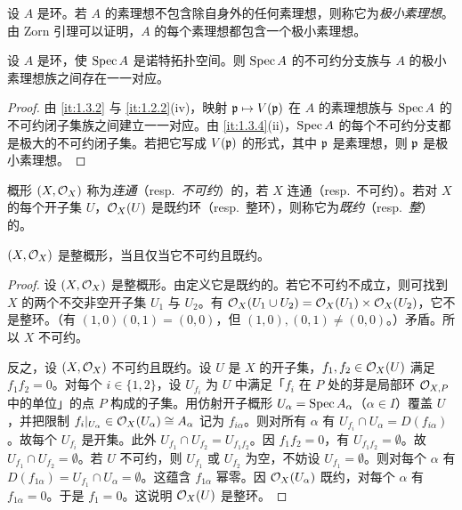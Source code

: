 设 $A$ 是环。若 $A$ 的素理想不包含除自身外的任何素理想，则称它为\emph{极小素理想}。由 Zorn 引理可以证明，$A$ 的每个素理想都包含一个极小素理想。

\begin{corollary}\label{it:1.3.5}
设 $A$ 是环，使 $\operatorname{Spec} A$ 是诺特拓扑空间。则 $\operatorname{Spec} A$ 的不可约分支族与 $A$ 的极小素理想族之间存在一一对应。
\end{corollary}

\begin{proof}
由 \ref{it:1.3.2} 与 \ref{it:1.2.2}(iv)，映射 $\mathfrak{p}\mapsto V(\mathfrak{p})$ 在 $A$ 的素理想族与 $\operatorname{Spec} A$ 的不可约闭子集族之间建立一一对应。由 \ref{it:1.3.4}(ii)，$\operatorname{Spec} A$ 的每个不可约分支都是极大的不可约闭子集。若把它写成 $V(\mathfrak{p})$ 的形式，其中 $\mathfrak{p}$ 是素理想，则 $\mathfrak{p}$ 是极小素理想。
\end{proof}

概形 $(X,\mathcal{O}_X)$ 称为\emph{连通}（resp.\ \emph{不可约}）的，若 $X$ 连通（resp.\ 不可约）。若对 $X$ 的每个开子集 $U$，$\mathcal{O}_X(U)$ 是既约环（resp.\ 整环），则称它为\emph{既约}（resp.\ \emph{整}）的。

\begin{proposition}\label{it:1.3.6}
$(X,\mathcal{O}_X)$ 是整概形，当且仅当它不可约且既约。
\end{proposition}

\begin{proof}
设 $(X,\mathcal{O}_X)$ 是整概形。由定义它是既约的。若它不可约不成立，则可找到 $X$ 的两个不交非空开子集 $U_1$ 与 $U_2$。有 $\mathcal{O}_X(U_1\cup U_2)=\mathcal{O}_X(U_1)\times \mathcal{O}_X(U_2)$，它不是整环。（有 $(1,0)(0,1)=(0,0)$，但 $(1,0),(0,1)\ne(0,0)$。）矛盾。所以 $X$ 不可约。

反之，设 $(X,\mathcal{O}_X)$ 不可约且既约。设 $U$ 是 $X$ 的开子集，$f_1,f_2\in \mathcal{O}_X(U)$ 满足 $f_1f_2=0$。对每个 $i\in\{1,2\}$，设 $U_{f_i}$ 为 $U$ 中满足「$f_i$ 在 $P$ 处的芽是局部环 $\mathcal{O}_{X,P}$ 中的单位」的点 $P$ 构成的子集。用仿射开子概形 $U_\alpha=\operatorname{Spec} A_\alpha$（$\alpha\in I$）覆盖 $U$，并把限制 $f_i|_{U_\alpha}\in \mathcal{O}_X(U_\alpha)\cong A_\alpha$ 记为 $f_{i\alpha}$。则对所有 $\alpha$ 有 $U_{f_i}\cap U_\alpha=D(f_{i\alpha})$。故每个 $U_{f_i}$ 是开集。此外 $U_{f_1}\cap U_{f_2}=U_{f_1f_2}$。因 $f_1f_2=0$，有 $U_{f_1f_2}=\emptyset$。故 $U_{f_1}\cap U_{f_2}=\emptyset$。若 $U$ 不可约，则 $U_{f_1}$ 或 $U_{f_2}$ 为空，不妨设 $U_{f_1}=\emptyset$。则对每个 $\alpha$ 有 $D(f_{1\alpha})=U_{f_1}\cap U_\alpha=\emptyset$。这蕴含 $f_{1\alpha}$ 幂零。因 $\mathcal{O}_X(U_\alpha)$ 既约，对每个 $\alpha$ 有 $f_{1\alpha}=0$。于是 $f_1=0$。这说明 $\mathcal{O}_X(U)$ 是整环。
\end{proof}

